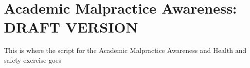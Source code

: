 \chapter{Academic Malpractice Awareness: DRAFT VERSION}


\begin{note}
  This is where the script for the Academic Malpractice Awareness and Health and safety exercise goes

\end{note}

